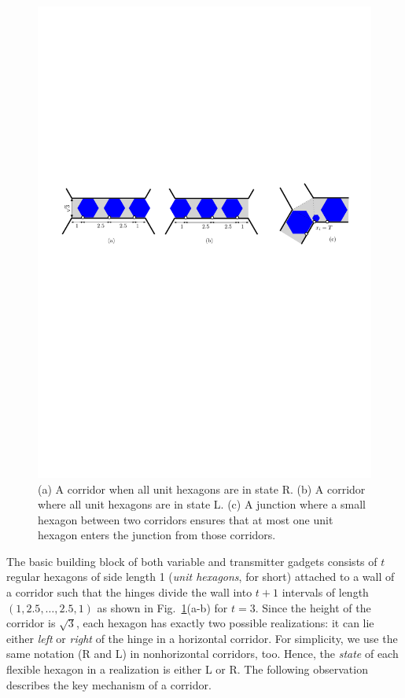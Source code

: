 \documentclass[runningheads]{article}
\begin{document}
\begin{figure}[htbp]
	\centering
	\includegraphics[width=0.9\columnwidth]{fig-variable-hex+}
	\caption{(a) A corridor when all unit hexagons are in state R.
(b) A corridor where all unit hexagons are in state L.
(c) A junction where a small hexagon between two corridors
    ensures that at most one unit hexagon enters the junction from those corridors.}
	\label{fig:variable}
\end{figure}

The basic building block of both variable and transmitter gadgets consists of $t$ regular hexagons of side length 1 (\emph{unit hexagons}, for short) attached to a wall of a corridor such that the hinges divide the wall into $t+1$ intervals of length $(1,2.5,\ldots ,2.5,1)$ as shown in Fig.~\ref{fig:variable}(a-b) for $t=3$. Since the height of the corridor is $\sqrt{3}$, each hexagon has exactly two possible realizations: it can lie either \emph{left} or \emph{right} of the hinge in a horizontal corridor. For simplicity, we use the same notation (R and L) in nonhorizontal corridors, too. Hence, the \emph{state} of each flexible hexagon in a realization is either L or R. The following observation describes the key mechanism of a corridor.
\end{document}
